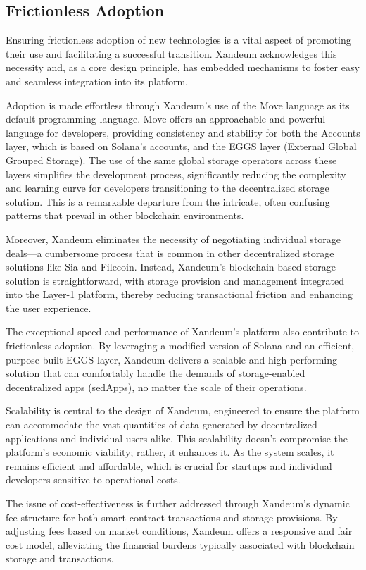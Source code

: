 \documentclass[11 pt]{article}   	%
\begin{document}
\subsection{Frictionless Adoption}
Ensuring frictionless adoption of new technologies is a vital aspect of promoting their use and facilitating a successful transition. Xandeum acknowledges this necessity and, as a core design principle, has embedded mechanisms to foster easy and seamless integration into its platform.

Adoption is made effortless through Xandeum's use of the Move language as its default programming language. Move offers an approachable and powerful language for developers, providing consistency and stability for both the Accounts layer, which is based on Solana's accounts, and the EGGS layer (External Global Grouped Storage). The use of the same global storage operators across these layers simplifies the development process, significantly reducing the complexity and learning curve for developers transitioning to the decentralized storage solution. This is a remarkable departure from the intricate, often confusing patterns that prevail in other blockchain environments.

Moreover, Xandeum eliminates the necessity of negotiating individual storage deals—a cumbersome process that is common in other decentralized storage solutions like Sia and Filecoin. Instead, Xandeum's blockchain-based storage solution is straightforward, with storage provision and management integrated into the Layer-1 platform, thereby reducing transactional friction and enhancing the user experience.

The exceptional speed and performance of Xandeum's platform also contribute to frictionless adoption. By leveraging a modified version of Solana and an efficient, purpose-built EGGS layer, Xandeum delivers a scalable and high-performing solution that can comfortably handle the demands of storage-enabled decentralized apps (sedApps), no matter the scale of their operations.

Scalability is central to the design of Xandeum, engineered to ensure the platform can accommodate the vast quantities of data generated by decentralized applications and individual users alike. This scalability doesn't compromise the platform's economic viability; rather, it enhances it. As the system scales, it remains efficient and affordable, which is crucial for startups and individual developers sensitive to operational costs.

The issue of cost-effectiveness is further addressed through Xandeum's dynamic fee structure for both smart contract transactions and storage provisions. By adjusting fees based on market conditions, Xandeum offers a responsive and fair cost model, alleviating the financial burdens typically associated with blockchain storage and transactions.
\end{document}
